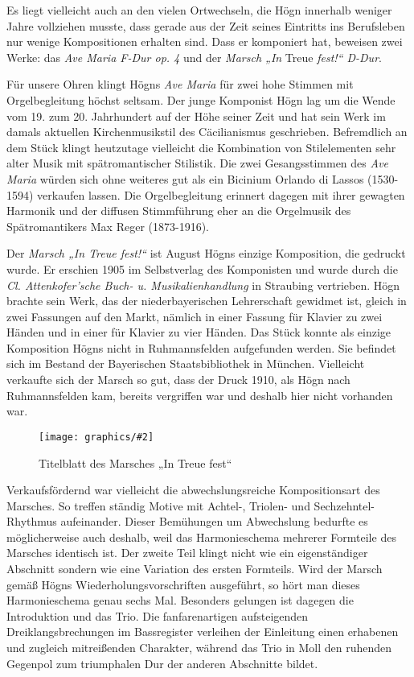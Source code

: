 \documentclass{book}
\newcommand{\img}[2][width=\linewidth]{\noindent\texttt{[image: graphics/\#2]}}
\begin{document}
Es liegt vielleicht auch an den vielen Ortwechseln, die Högn innerhalb
weniger Jahre vollziehen musste, dass gerade aus der Zeit seines
Eintritts ins Berufsleben nur wenige Kompositionen erhalten sind. Dass
er komponiert hat, beweisen zwei Werke: das \textit{Ave Maria F-Dur op.
4} und der \textit{Marsch „In} Treue \textit{fest!“ D-Dur}.

Für unsere Ohren klingt Högns \textit{Ave Maria} für zwei hohe Stimmen
mit Orgelbegleitung höchst seltsam. Der junge Komponist Högn lag um
die Wende vom 19. zum 20. Jahrhundert auf der Höhe seiner Zeit und hat
sein Werk im damals aktuellen Kirchenmusikstil des Cäcilianismus
geschrieben. Befremdlich an dem Stück klingt heutzutage vielleicht die
Kombination von Stilelementen sehr alter Musik mit spätromantischer
Stilistik. Die zwei Gesangsstimmen des \textit{Ave Maria} würden sich
ohne weiteres gut als ein Bicinium Orlando di Lassos (1530-1594)
verkaufen lassen. Die Orgelbegleitung erinnert dagegen mit ihrer
gewagten Harmonik und der diffusen Stimmführung eher an die Orgelmusik
des Spätromantikers Max Reger (1873-1916).

Der \textit{Marsch „In Treue fest!“} ist August Högns einzige
Komposition, die gedruckt wurde. Er erschien 1905 im Selbstverlag des
Komponisten und wurde durch die \textit{Cl. Attenkofer’sche Buch- u.
Musikalienhandlung} in Straubing vertrieben. Högn brachte sein Werk,
das der niederbayerischen Lehrerschaft gewidmet ist, gleich in zwei
Fassungen auf den Markt, nämlich in einer Fassung für Klavier zu zwei
Händen und in einer für Klavier zu vier Händen. Das Stück konnte als
einzige Komposition Högns nicht in Ruhmannsfelden aufgefunden werden.
Sie befindet sich im Bestand der Bayerischen Staatsbibliothek in
München. Vielleicht verkaufte sich der Marsch so gut, dass der Druck
1910, als Högn nach Ruhmannsfelden kam, bereits vergriffen war und
deshalb hier nicht vorhanden war.

\begin{figure}
\img{Marsch-In-Treue-fest}
\caption{Titelblatt des Marsches „In Treue fest“}
\end{figure}

Verkaufsfördernd war vielleicht die abwechslungsreiche Kompositionsart
des Marsches. So treffen ständig Motive mit Achtel-, Triolen- und
Sechzehntel-Rhythmus aufeinander. Dieser Bemühungen um Abwechslung
bedurfte es möglicherweise auch deshalb, weil das Harmonieschema
mehrerer Formteile des Marsches identisch ist. Der zweite Teil klingt
nicht wie ein eigenständiger Abschnitt sondern wie eine Variation des
ersten Formteils. Wird der Marsch gemäß Högns Wiederholungsvorschriften
ausgeführt, so hört man dieses Harmonieschema genau sechs Mal.
Besonders gelungen ist dagegen die Introduktion und das Trio. Die
fanfarenartigen aufsteigenden Dreiklangsbrechungen im Bassregister
verleihen der Einleitung einen erhabenen und zugleich mitreißenden
Charakter, während das Trio in Moll den ruhenden Gegenpol zum
triumphalen Dur der anderen Abschnitte bildet.
\end{document}
